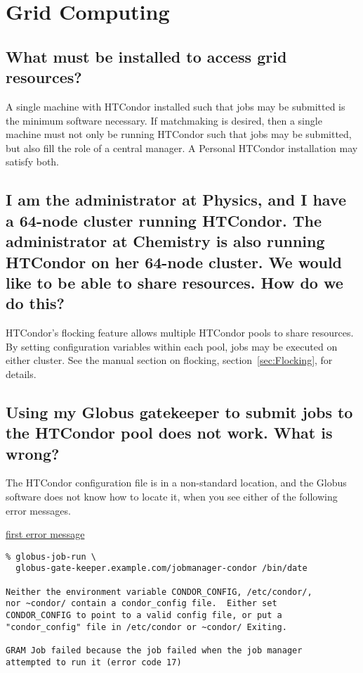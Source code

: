 \section{Grid Computing}


\subsection*{What must be installed to access grid resources?}
A single machine with HTCondor installed such that jobs may
be submitted is the minimum software necessary.
If matchmaking is desired,
then a single machine must not only be running HTCondor
such that jobs may be submitted,
but also fill the role of a central manager.
A Personal HTCondor installation may satisfy both.

\subsection*{I am the administrator at Physics, and I have a 64-node cluster
running HTCondor.
The administrator at Chemistry is also running HTCondor on her 64-node cluster.
We would like to be able to share resources.
How do we do this?}

HTCondor's flocking feature
allows multiple HTCondor pools to share resources.
By setting configuration variables within each pool,
jobs may be executed on either cluster.
See the manual section on flocking, section~\ref{sec:Flocking},
for details.

\subsection*{Using my Globus gatekeeper to submit jobs to the HTCondor pool
does not work.  What is wrong?}

The HTCondor configuration file is in a non-standard location,
and the Globus software does not know how to locate it,
when you see either of the following error messages.

\underline{first error message}
\footnotesize
\begin{verbatim}
% globus-job-run \
  globus-gate-keeper.example.com/jobmanager-condor /bin/date

Neither the environment variable CONDOR_CONFIG, /etc/condor/,
nor ~condor/ contain a condor_config file.  Either set
CONDOR_CONFIG to point to a valid config file, or put a
"condor_config" file in /etc/condor or ~condor/ Exiting.

GRAM Job failed because the job failed when the job manager
attempted to run it (error code 17)
\end{verbatim}
\normalsize

